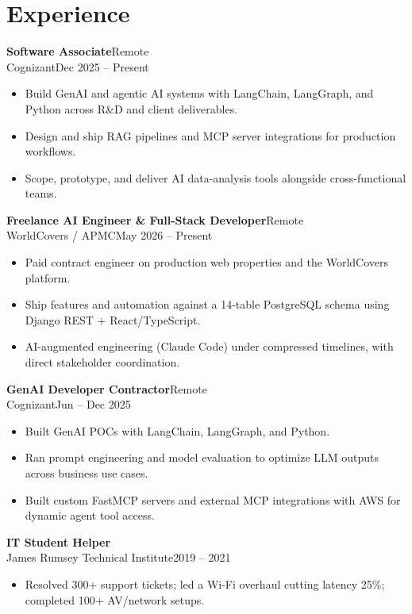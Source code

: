 \documentclass[10pt]{article}
\newcommand{\dentry}[4]{\noindent\textbf{#1}\hfill{#2}\\{#3}\hfill{#4}\par}
\begin{document}
\section*{Experience}
\dentry{Software Associate}{Remote}{Cognizant}{Dec 2025 – Present}
\begin{itemize}
  \item Build GenAI and agentic AI systems with LangChain, LangGraph, and Python across R\&D and client deliverables.
  \item Design and ship RAG pipelines and MCP server integrations for production workflows.
  \item Scope, prototype, and deliver AI data-analysis tools alongside cross-functional teams.
\end{itemize}
\dentry{Freelance AI Engineer \& Full-Stack Developer}{Remote}{WorldCovers / APMC}{May 2026 – Present}
\begin{itemize}
  \item Paid contract engineer on production web properties and the WorldCovers platform.
  \item Ship features and automation against a 14-table PostgreSQL schema using Django REST + React/TypeScript.
  \item AI-augmented engineering (Claude Code) under compressed timelines, with direct stakeholder coordination.
\end{itemize}
\dentry{GenAI Developer Contractor}{Remote}{Cognizant}{Jun – Dec 2025}
\begin{itemize}
  \item Built GenAI POCs with LangChain, LangGraph, and Python.
  \item Ran prompt engineering and model evaluation to optimize LLM outputs across business use cases.
  \item Built custom FastMCP servers and external MCP integrations with AWS for dynamic agent tool access.
\end{itemize}
\dentry{IT Student Helper}{}{James Rumsey Technical Institute}{2019 – 2021}
\begin{itemize}
  \item Resolved 300+ support tickets; led a Wi-Fi overhaul cutting latency 25\%; completed 100+ AV/network setups.
\end{itemize}
\end{document}
